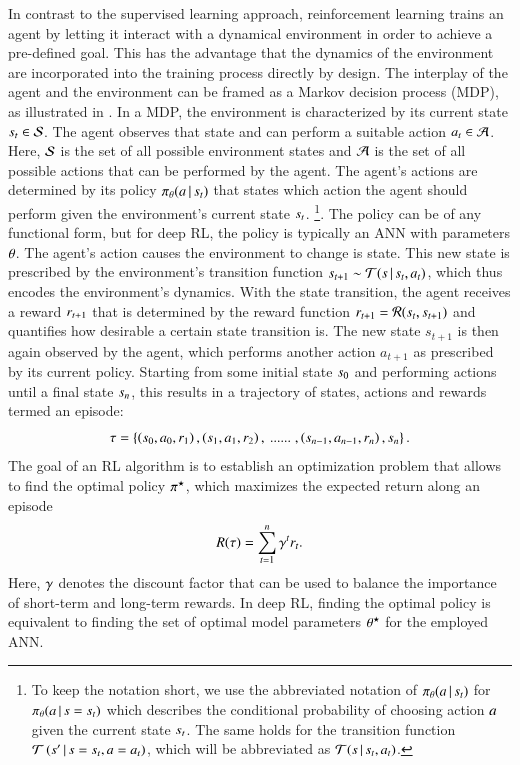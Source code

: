 In contrast to the supervised learning approach, reinforcement learning trains an agent by letting it interact with a dynamical environment in order to achieve a pre-defined goal.
This has the advantage that the dynamics of the environment are incorporated into the training process directly by design.
The interplay of the agent and the environment can be framed as a Markov decision process (MDP), as illustrated in .
In a MDP, the environment is characterized by its current state $s_t\in\mathcal{S}$.
The agent observes that state and can perform a suitable action $a_t\in\mathcal{A}$.
Here, $\mathcal{S}$ is the set of all possible environment states and $\mathcal{A}$ is the set of all possible actions that can be performed by the agent.
The agent's actions are determined by its policy $\pi_{\theta}(a \,|\, s_t )$ that states which action the agent should perform given the environment's current state $s_t$.%
\footnote{
  To keep the notation short, we use the abbreviated notation of $\pi_{\theta}(a \,|\, s_t )$ for $\pi_{\theta}(a\,|\,s=s_{t})$ which describes the conditional probability of choosing action $a$ given the current state $s_t$.
The same holds for the transition function $\mathcal{T}\left(s'\,|\,s=s_{t},a=a_{t}\right)$, which will be abbreviated as $\mathcal{T}(s \,|\, s_t ,a_t )$.
}.
The policy can be of any functional form, but for deep RL, the policy is typically an ANN with parameters $\theta$.
The agent's action causes the environment to change is state.
This new state is prescribed by the environment's transition function $s_{t+1}\sim\mathcal{T}(s \,|\, s_t ,a_t )$, which thus encodes the environment's dynamics.
With the state transition, the agent receives a reward $r_{t+1}$ that is determined by the reward function $r_{t+1}=\mathcal{R}(s_{t},s_{t+1})$ and quantifies how desirable a certain state transition is.
The new state $s_{t+1}$ is then again observed by the agent, which performs another action $a_{t+1}$ as prescribed by its current policy.
Starting from some initial state $s_0$ and performing actions until a final state $s_n$, this results in a trajectory of states, actions and rewards termed an episode:
\begin{equation}
  \tau = \left\{ \left(s_0,a_0,r_1\right),\left(s_1,a_1,r_2\right),\:......\;,\left(s_{n-1},a_{n-1},r_{n}\right),s_n\right\} .
  \label{eq:trajectory4}
\end{equation}
The goal of an RL algorithm is to establish an optimization problem that allows to find the optimal policy $\pi^{\star}$, which maximizes the expected return along an episode
\begin{equation}
  R(\tau) = \sum_{t=1}^{n} \gamma^t r_{t} .
\end{equation}
Here, $\gamma$ denotes the discount factor that can be used to balance the importance of short-term and long-term rewards.
In deep RL, finding the optimal policy is equivalent to finding the set of optimal model parameters $\theta^{\star}$ for the employed ANN.

